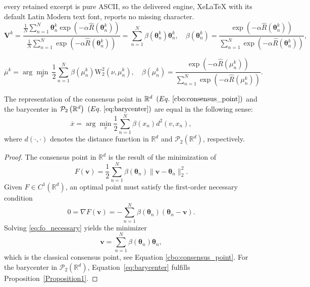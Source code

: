 \documentclass[10pt,a4paper]{amsart}
\newcommand{\R}{\mathbb{R}}
\begin{document}
every retained excerpt is pure ASCII, so the delivered engine, XeLaTeX with its default Latin Modern text font, reports no missing character.
	\begin{equation}\label{cbo:consensus_point}
		\bm{V}^{k} = \frac{\frac{1}{N}\sum_{n=1}^{N}\bm{\theta}^{k}_{n}\exp\left( -\alpha \hat{R}(\bm{\theta}^{k}_{n})\right)}{ \frac{1}{N}\sum_{n=1}^{N}\exp\left( -\alpha \hat{R}(\bm{\theta}^{k}_{n})\right)} = \sum_{n=1}^{N} \beta(\bm{\theta}^{k}_{n}) \bm{\theta}^{k}_{n}, \quad \beta(\bm{\theta}^{k}_{n}) = \frac{\exp(-\alpha \hat{R}(\bm{\theta}^{k}_{n}))}{\sum_{n=1}^{N}\exp(-\alpha \hat{R}(\bm{\theta}^{k}_{n}))},
	\end{equation}

	\begin{equation}\label{eq:barycenter}
		\overline{\mu}^{k} = \arg \min_{\nu}~ \frac{1}{2}\sum_{n=1}^{N} \beta\left( \mu_{n}^{k}\right)\mathrm{W}_{2}^{2}\left( \nu, \mu_{n}^{k} \right), \quad \beta(\mu_{n}^{k}) = \frac{\exp(-\alpha \hat{R}(\mu_{n}^{k}))}{\sum_{n=1}^{N}\exp(-\alpha \hat{R}(\mu_{n}^{k}))}.    
	\end{equation} 

	\begin{proposition}\label{Proposition1}
		The representation of the consensus point in $\R^{d}~\left(Eq.~\eqref{cbo:consensus_point}\right)$ and the barycenter in $ \mathcal{P}_{2}\left( \R^{d} \right)~\left(Eq.~\eqref{eq:barycenter}\right)$ are equal in the following sense:
		\begin{equation}\label{eq:frechet_mean}
			\overline{x} = \arg \min_{v} \frac{1}{2}\sum_{n=1}^{N}\beta \left( x_n \right) d^{2}\left( v, x_{n} \right),
		\end{equation}
		where $ d \left( \cdot, \cdot \right)  $ denotes the distance function in $ \R^{d} $ and $ \mathcal{P}_{2}(\R^{d}) $, respectively.
	\end{proposition}

	\begin{proof}
	The consensus point in $ \R^{d} $ is the result of the minimization of 
		\begin{equation}
			F \left( \bm{v} \right) = \frac{1}{2}\sum_{n=1}^{N}\beta \left( \bm{\theta}_{n} \right) \|\bm{v} - \bm{\theta}_{n} \|_{2}^{2}. 
		\end{equation}
		Given $ F \in C^{1}\left( \R^{d} \right)  $, an optimal point must satisfy the first-order necessary condition
		\begin{equation}\label{eq:fo_necessary}
			0 = \nabla F\left( \bm{v} \right) = - \sum_{n=1}^{N}\beta \left( \bm{\theta}_{n} \right)\left( \bm{\theta}_{n} - \bm{v} \right).
		\end{equation}
		Solving \eqref{eq:fo_necessary} yields the minimizer
		\begin{equation}\label{eq:consensus_linear_form}
			\bm{v}= \sum_{n=1}^{N} \beta \left( \bm{\theta}_{n} \right) \bm{\theta}_{n},
		\end{equation}
		which is the classical consensus point, see Equation \eqref{cbo:consensus_point}. For the barycenter in $ \mathcal{P}_{2}(\R^{d}) $, Equation~\eqref{eq:barycenter} fulfills Proposition~\ref{Proposition1}.
	\end{proof}
\end{document}
